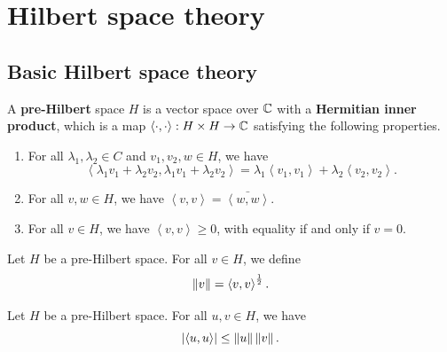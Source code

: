 \documentclass[a4paper]{article}
\renewcommand{\braket}[2]{\left\langle #1, #1 \right\rangle}
\begin{document}
\section{Hilbert space theory}

\subsection{Basic Hilbert space theory}

\begin{defi}
  A \textbf{pre-Hilbert} space $H$ is a vector space over 
  $\mathbb{C}$ with a \textbf{Hermitian inner product}, which is a 
  map $\braket{\cdot}{\cdot} : H \times H \to \C$ satisfying
  the following properties.

  \begin{enumerate}
    \item For all $\lambda_1, \lambda_2 \in C$ and 
    $v_1, v_2, w \in H$, we have 
    \[
    \braket{\lambda_1 v_1 + \lambda_2 v_2}{w} 
    = \lambda_1 \braket{v_1}{2} + \lambda_2 \braket{v_2}{w}.
    \]

    \item For all $v, w \in H$, we have $\braket{v}{w} 
    = \bar{\braket{w}{v}}$.

    \item For all $v \in H$, we have $\braket{v}{v} \geq 0$, 
    with equality if and only if $v = 0$.
  \end{enumerate}
\end{defi}

\begin{defi}
Let $H$ be a pre-Hilbert space. For all $v \in H$, we 
define 
\[
\norm{v} = \braket{v}{v}^{\frac{1}{2}}.
\]
\end{defi}

\begin{thm}
Let $H$ be a pre-Hilbert space. For all $u, v \in H$, we
have 
\[
\abs{\braket{u}{v}} \leq \norm{u} \norm{v}.
\]
\end{thm}
\end{document}
